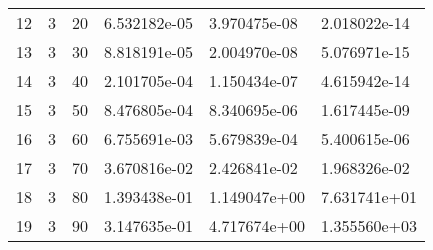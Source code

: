 \documentclass{article}
\begin{document}
\begin{center}
\begin{tabular}{llllll}
12 &         3 &         20 &  6.532182e-05 &          3.970475e-08 &                      2.018022e-14 \\
13 &         3 &         30 &  8.818191e-05 &          2.004970e-08 &                      5.076971e-15 \\
14 &         3 &         40 &  2.101705e-04 &          1.150434e-07 &                      4.615942e-14 \\
15 &         3 &         50 &  8.476805e-04 &          8.340695e-06 &                      1.617445e-09 \\
16 &         3 &         60 &  6.755691e-03 &          5.679839e-04 &                      5.400615e-06 \\
17 &         3 &         70 &  3.670816e-02 &          2.426841e-02 &                      1.968326e-02 \\
18 &         3 &         80 &  1.393438e-01 &          1.149047e+00 &                      7.631741e+01 \\
19 &         3 &         90 &  3.147635e-01 &          4.717674e+00 &                      1.355560e+03 \\
\bottomrule
\end{tabular}
\end{center}
\end{document}
